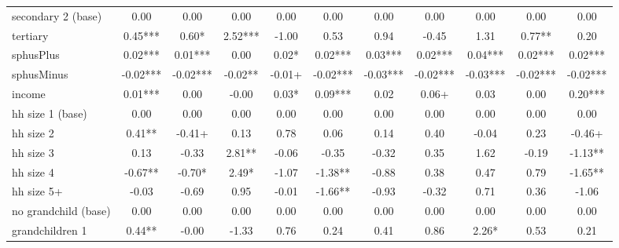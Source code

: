 {\begin{tabular}{l*{10}{c}}
secondary 2 (base)&        0.00   &        0.00   &        0.00   &        0.00   &        0.00   &        0.00   &        0.00   &        0.00   &        0.00   &        0.00   \\
tertiary    &        0.45***&        0.60*  &        2.52***&       -1.00   &        0.53   &        0.94   &       -0.45   &        1.31   &        0.77** &        0.20   \\
sphusPlus   &        0.02***&        0.01***&        0.00   &        0.02*  &        0.02***&        0.03***&        0.02***&        0.04***&        0.02***&        0.02***\\
sphusMinus  &       -0.02***&       -0.02***&       -0.02** &       -0.01+  &       -0.02***&       -0.03***&       -0.02***&       -0.03***&       -0.02***&       -0.02***\\
income      &        0.01***&        0.00   &       -0.00   &        0.03*  &        0.09***&        0.02   &        0.06+  &        0.03   &        0.00   &        0.20***\\
hh size 1 (base)&        0.00   &        0.00   &        0.00   &        0.00   &        0.00   &        0.00   &        0.00   &        0.00   &        0.00   &        0.00   \\
hh size 2   &        0.41** &       -0.41+  &        0.13   &        0.78   &        0.06   &        0.14   &        0.40   &       -0.04   &        0.23   &       -0.46+  \\
hh size 3   &        0.13   &       -0.33   &        2.81** &       -0.06   &       -0.35   &       -0.32   &        0.35   &        1.62   &       -0.19   &       -1.13** \\
hh size 4   &       -0.67** &       -0.70*  &        2.49*  &       -1.07   &       -1.38** &       -0.88   &        0.38   &        0.47   &        0.79   &       -1.65** \\
hh size 5+  &       -0.03   &       -0.69   &        0.95   &       -0.01   &       -1.66** &       -0.93   &       -0.32   &        0.71   &        0.36   &       -1.06   \\
no grandchild (base)&        0.00   &        0.00   &        0.00   &        0.00   &        0.00   &        0.00   &        0.00   &        0.00   &        0.00   &        0.00   \\
grandchildren 1&        0.44** &       -0.00   &       -1.33   &        0.76   &        0.24   &        0.41   &        0.86   &        2.26*  &        0.53   &        0.21   \\

\end{tabular}}
